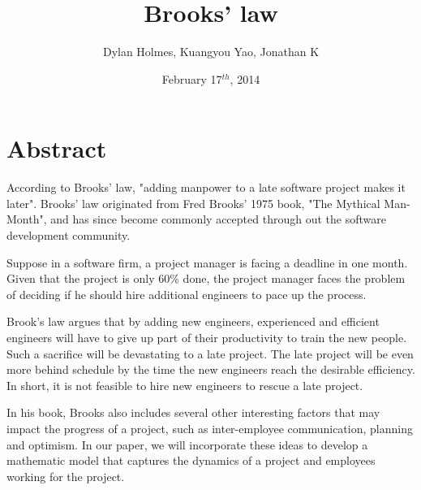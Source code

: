 \documentclass{article}
\author{Dylan Holmes, Kuangyou Yao, Jonathan K}
\title{Brooks' law}
\date{February 17$^{th}$, 2014}
\begin{document}
\maketitle

\section*{Abstract}
According to Brooks' law, "adding manpower to a late software project makes it
later". Brooks' law originated from Fred Brooks' 1975 book, "The Mythical
Man-Month", and has since become commonly accepted through out the software
development community. 

Suppose in a software firm, a project manager is facing a deadline in one month.
Given that the project is only 60\% done, the project manager faces the problem
of deciding if he should hire additional engineers to pace up the process.

Brook’s law argues that by adding new engineers, experienced and efficient
engineers will have to give up part of their productivity to train the new
people. Such a sacrifice will be devastating to a late project. The late project
will be even more behind schedule by the time the new engineers reach the
desirable efficiency. In short, it is not feasible to hire new engineers to
rescue a late project.

In his book, Brooks also includes several other interesting factors that may
impact the progress of a project, such as inter-employee communication, planning
and optimism. In our paper, we will incorporate these ideas to develop a
mathematic model that captures the dynamics of a project and employees working
for the project.
\end{document}

